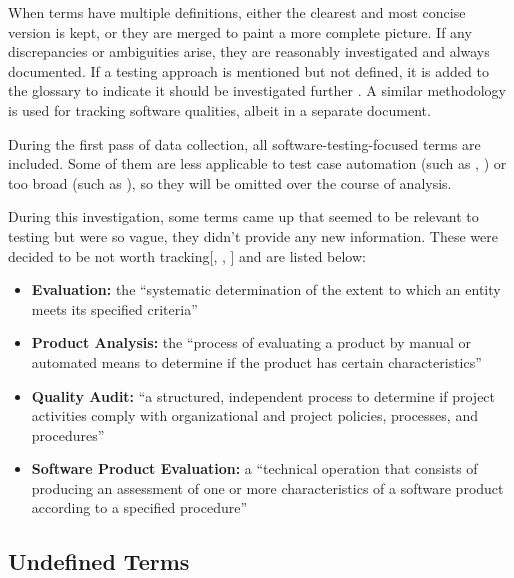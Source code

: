 When terms have multiple definitions, either the clearest and most concise
version is kept, or they are merged to paint a more complete picture.
If any discrepancies or ambiguities
arise, they are reasonably investigated and always documented. If a
testing approach is mentioned but not defined, it is added to the
glossary to indicate it should be investigated further%
. A similar methodology
is used for tracking software qualities, albeit in a separate
document.

During the first pass of data collection, all software-testing-focused terms
are included. Some of them are less applicable to test case automation
\ifnotpaper(such as , ) \fi or too
broad (such as \fi), so they
will be omitted over the course of analysis.

\ifnotpaper
    During this investigation, some terms came up that seemed to be relevant to
    testing but were so vague, they didn't provide any new information. These were
    decided to be not worth tracking[, ,
        ] and are listed below:

    \begin{itemize}
        \item \textbf{Evaluation:} the ``systematic determination of the extent
              to which an entity meets its specified criteria''
              \citep[p.~167]{IEEE2017}
        \item \textbf{Product Analysis:} the ``process of evaluating a product by
              manual or automated means to determine if the product has certain
              characteristics'' \citep[p.~343]{IEEE2017}
        \item \textbf{Quality Audit:} ``a structured, independent process to
              determine if project activities comply with organizational and
              project policies, processes, and procedures'' \citep[p.~361]{IEEE2017}
        \item \textbf{Software Product Evaluation:} a ``technical operation that
              consists of producing an assessment of one or more characteristics
              of a software product according to a specified procedure''
              \citep[p.~424]{IEEE2017}
    \end{itemize}
\fi
\subsection{Undefined Terms}
\label{undef-terms}

